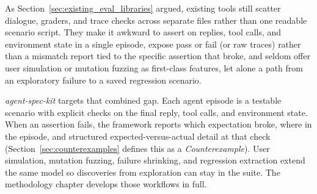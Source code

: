 As Section~\ref{sec:existing_eval_libraries} argued, existing tools still scatter dialogue, graders, and trace checks across separate files rather than one readable scenario script. They make it awkward to assert on replies, tool calls, and environment state in a single episode, expose pass or fail (or raw traces) rather than a mismatch report tied to the specific assertion that broke, and seldom offer user simulation or mutation fuzzing as first-class features, let alone a path from an exploratory failure to a saved regression scenario.

\emph{agent-spec-kit} targets that combined gap. Each agent episode is a testable scenario with explicit checks on the final reply, tool calls, and environment state. When an assertion fails, the framework reports which expectation broke, where in the episode, and structured expected-versus-actual detail at that check (Section~\ref{sec:counterexamples} defines this as a \emph{Counterexample}). User simulation, mutation fuzzing, failure shrinking, and regression extraction extend the same model so discoveries from exploration can stay in the suite. The methodology chapter develops those workflows in full.
